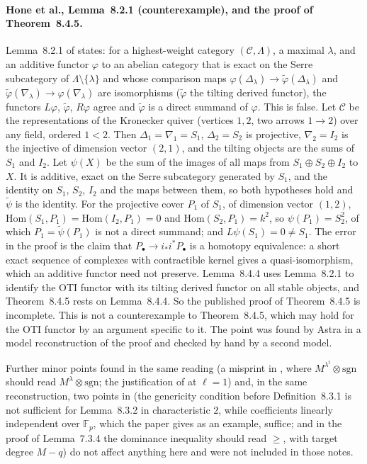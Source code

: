 \paragraph{Hone et al., Lemma~8.2.1 (counterexample), and the proof of Theorem~8.4.5.}
Lemma~8.2.1 of \cite{hone2025} states: for a highest-weight category $(\mathcal C,\Lambda)$, a
maximal $\lambda$, and an additive functor $\varphi$ to an abelian category that is exact on
the Serre subcategory of $\Lambda\setminus\{\lambda\}$ and whose comparison maps
$\varphi(\Delta_\lambda)\to\tilde\varphi(\Delta_\lambda)$ and
$\tilde\varphi(\nabla_\lambda)\to\varphi(\nabla_\lambda)$ are isomorphisms ($\tilde\varphi$
the tilting derived functor), the functors $L\varphi$, $\tilde\varphi$, $R\varphi$ agree and
$\tilde\varphi$ is a direct summand of $\varphi$.  This is false.  Let $\mathcal C$ be the
representations of the Kronecker quiver (vertices $1,2$, two arrows $1\to2$) over any field,
ordered $1<2$.  Then $\Delta_1=\nabla_1=S_1$, $\Delta_2=S_2$ is projective, $\nabla_2=I_2$ is
the injective of dimension vector $(2,1)$, and the tilting objects are the sums of $S_1$ and
$I_2$.  Let $\psi(X)$ be the sum of the images of all maps from $S_1\oplus S_2\oplus I_2$ to
$X$.  It is additive, exact on the Serre subcategory generated by $S_1$, and the identity on
$S_1$, $S_2$, $I_2$ and the maps between them, so both hypotheses hold and $\tilde\psi$ is the
identity.  For the projective cover $P_1$ of $S_1$, of dimension vector $(1,2)$,
$\mathrm{Hom}(S_1,P_1)=\mathrm{Hom}(I_2,P_1)=0$ and $\mathrm{Hom}(S_2,P_1)=k^2$, so
$\psi(P_1)=S_2^2$, of which $P_1=\tilde\psi(P_1)$ is not a direct summand; and
$L\psi(S_1)=0\ne S_1$.  The error in the proof is the claim that $P_\bullet\to
i_*i^*P_\bullet$ is a homotopy equivalence: a short exact sequence of complexes with
contractible kernel gives a quasi-isomorphism, which an additive functor need not preserve.
Lemma~8.4.4 uses Lemma~8.2.1 to identify the OTI functor with its tilting derived functor on
all stable objects, and Theorem~8.4.5 rests on Lemma~8.4.4.  So the published proof of
Theorem~8.4.5 is incomplete.  This is not a counterexample to Theorem~8.4.5, which may hold
for the OTI functor by an argument specific to it.  The point was found by Astra in a model
reconstruction of the proof and checked by hand by a second model.

Further minor points found in the same reading (a misprint in \cite[\S7.3]{hone2025},
where $M^{\lambda^t}\otimes\mathrm{sgn}$ should read $M^\lambda\otimes\mathrm{sgn}$; the
justification of \cite[Prop.~2.7]{harman2015} at $\ell=1$) and, in the same reconstruction, two points
in \cite[\S8.3, \S7.3]{hone2025} (the genericity condition before Definition~8.3.1 is not
sufficient for Lemma~8.3.2 in characteristic $2$, while coefficients linearly independent
over $\mathbb F_p$, which the paper gives as an example, suffice; and in the proof of
Lemma~7.3.4 the dominance inequality should read $\ge$, with target degree $M-q$) do not
affect anything here and were not included in those notes.
